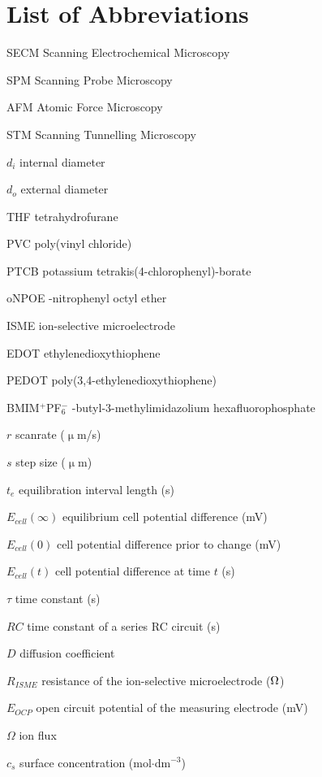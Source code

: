 \chapter{List of Abbreviations}
SECM \dotfill Scanning Electrochemical Microscopy

SPM \dotfill Scanning Probe Microscopy

AFM \dotfill Atomic Force Microscopy

STM \dotfill Scanning Tunnelling Microscopy

$d_i$ \dotfill internal diameter

$d_o$ \dotfill external diameter

THF \dotfill tetrahydrofurane

PVC \dotfill poly(vinyl chloride)

PTCB \dotfill potassium tetrakis(4-chlorophenyl)-borate

oNPOE -nitrophenyl octyl ether

ISME \dotfill ion-selective microelectrode

EDOT \dotfill ethylenedioxythiophene

PEDOT \dotfill poly(3,4-ethylenedioxythiophene)

BMIM$^+$PF$_6^-$ -butyl-3-methylimidazolium hexafluorophosphate 

$r$ \dotfill scanrate ($\upmu$m/s)

$s$ \dotfill step size ($\upmu$m)

$t_e$ \dotfill equilibration interval length (s)

$E_{cell}(\infty)$ \dotfill equilibrium cell potential difference (mV)

$E_{cell}(0)$ \dotfill cell potential difference prior to change (mV)

$E_{cell}(t)$ \dotfill cell potential difference at time $t$ (s)

$\tau$ \dotfill time constant (s)

$RC$ \dotfill time constant of a series RC circuit (s)

$D$ \dotfill diffusion coefficient

$R_{ISME}$ \dotfill resistance of the ion-selective microelectrode ($\ohm$)

$E_{OCP}$ \dotfill open circuit potential of the measuring electrode (mV)

$\Omega$ \dotfill ion flux

$c_s$ \dotfill surface concentration (mol$\cdot$dm$^{-3}$)

